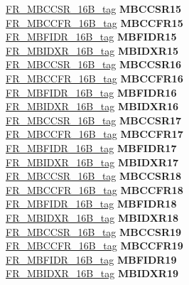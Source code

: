 \begin{DoxyCompactItemize}
\begin{tabbing}
\>\>\mbox{\hyperlink{unionFR__MBCCSR__16B__tag}{FR\_MBCCSR\_16B\_tag}} {\bfseries MBCCSR15}\\
\>\>\mbox{\hyperlink{unionFR__MBCCFR__16B__tag}{FR\_MBCCFR\_16B\_tag}} {\bfseries MBCCFR15}\\
\>\>\mbox{\hyperlink{unionFR__MBFIDR__16B__tag}{FR\_MBFIDR\_16B\_tag}} {\bfseries MBFIDR15}\\
\>\>\mbox{\hyperlink{unionFR__MBIDXR__16B__tag}{FR\_MBIDXR\_16B\_tag}} {\bfseries MBIDXR15}\\
\>\>\mbox{\hyperlink{unionFR__MBCCSR__16B__tag}{FR\_MBCCSR\_16B\_tag}} {\bfseries MBCCSR16}\\
\>\>\mbox{\hyperlink{unionFR__MBCCFR__16B__tag}{FR\_MBCCFR\_16B\_tag}} {\bfseries MBCCFR16}\\
\>\>\mbox{\hyperlink{unionFR__MBFIDR__16B__tag}{FR\_MBFIDR\_16B\_tag}} {\bfseries MBFIDR16}\\
\>\>\mbox{\hyperlink{unionFR__MBIDXR__16B__tag}{FR\_MBIDXR\_16B\_tag}} {\bfseries MBIDXR16}\\
\>\>\mbox{\hyperlink{unionFR__MBCCSR__16B__tag}{FR\_MBCCSR\_16B\_tag}} {\bfseries MBCCSR17}\\
\>\>\mbox{\hyperlink{unionFR__MBCCFR__16B__tag}{FR\_MBCCFR\_16B\_tag}} {\bfseries MBCCFR17}\\
\>\>\mbox{\hyperlink{unionFR__MBFIDR__16B__tag}{FR\_MBFIDR\_16B\_tag}} {\bfseries MBFIDR17}\\
\>\>\mbox{\hyperlink{unionFR__MBIDXR__16B__tag}{FR\_MBIDXR\_16B\_tag}} {\bfseries MBIDXR17}\\
\>\>\mbox{\hyperlink{unionFR__MBCCSR__16B__tag}{FR\_MBCCSR\_16B\_tag}} {\bfseries MBCCSR18}\\
\>\>\mbox{\hyperlink{unionFR__MBCCFR__16B__tag}{FR\_MBCCFR\_16B\_tag}} {\bfseries MBCCFR18}\\
\>\>\mbox{\hyperlink{unionFR__MBFIDR__16B__tag}{FR\_MBFIDR\_16B\_tag}} {\bfseries MBFIDR18}\\
\>\>\mbox{\hyperlink{unionFR__MBIDXR__16B__tag}{FR\_MBIDXR\_16B\_tag}} {\bfseries MBIDXR18}\\
\>\>\mbox{\hyperlink{unionFR__MBCCSR__16B__tag}{FR\_MBCCSR\_16B\_tag}} {\bfseries MBCCSR19}\\
\>\>\mbox{\hyperlink{unionFR__MBCCFR__16B__tag}{FR\_MBCCFR\_16B\_tag}} {\bfseries MBCCFR19}\\
\>\>\mbox{\hyperlink{unionFR__MBFIDR__16B__tag}{FR\_MBFIDR\_16B\_tag}} {\bfseries MBFIDR19}\\
\>\>\mbox{\hyperlink{unionFR__MBIDXR__16B__tag}{FR\_MBIDXR\_16B\_tag}} {\bfseries MBIDXR19}\\

\end{tabbing}
\end{DoxyCompactItemize}
